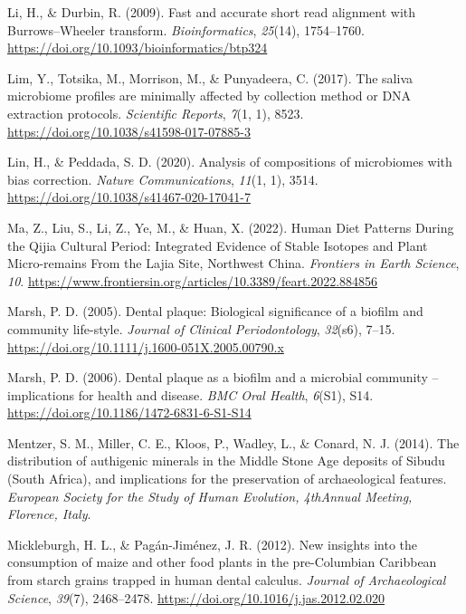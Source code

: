 \documentclass[
]{article}
\newlength{\cslhangindent}
\newlength{\cslentryspacingunit} %
\newenvironment{CSLReferences}[2] %
 {%
  \setlength{\parindent}{0pt}
  \ifodd #1
  \let\oldpar\par
  \def\par{\hangindent=\cslhangindent\oldpar}
  \fi
  \setlength{\parskip}{#2\cslentryspacingunit}
 }%
 {}
\begin{document}
\begin{CSLReferences}{1}{0}
\leavevmode{}%
Li, H., \& Durbin, R. (2009). Fast and accurate short read alignment
with {Burrows}--{Wheeler} transform. \emph{Bioinformatics},
\emph{25}(14), 1754--1760.
\url{https://doi.org/10.1093/bioinformatics/btp324}

\leavevmode{}%
Lim, Y., Totsika, M., Morrison, M., \& Punyadeera, C. (2017). The saliva
microbiome profiles are minimally affected by collection method or {DNA}
extraction protocols. \emph{Scientific Reports}, \emph{7}(1, 1), 8523.
\url{https://doi.org/10.1038/s41598-017-07885-3}

\leavevmode{}%
Lin, H., \& Peddada, S. D. (2020). Analysis of compositions of
microbiomes with bias correction. \emph{Nature Communications},
\emph{11}(1, 1), 3514. \url{https://doi.org/10.1038/s41467-020-17041-7}

\leavevmode{}%
Ma, Z., Liu, S., Li, Z., Ye, M., \& Huan, X. (2022). Human {Diet
Patterns During} the {Qijia Cultural Period}: {Integrated Evidence} of
{Stable Isotopes} and {Plant Micro-remains From} the {Lajia Site},
{Northwest China}. \emph{Frontiers in Earth Science}, \emph{10}.
\url{https://www.frontiersin.org/articles/10.3389/feart.2022.884856}

\leavevmode{}%
Marsh, P. D. (2005). Dental plaque: Biological significance of a biofilm
and community life-style. \emph{Journal of Clinical Periodontology},
\emph{32}(s6), 7--15.
\url{https://doi.org/10.1111/j.1600-051X.2005.00790.x}

\leavevmode{}%
Marsh, P. D. (2006). Dental plaque as a biofilm and a microbial
community -- implications for health and disease. \emph{BMC Oral
Health}, \emph{6}(S1), S14.
\url{https://doi.org/10.1186/1472-6831-6-S1-S14}

\leavevmode{}%
Mentzer, S. M., Miller, C. E., Kloos, P., Wadley, L., \& Conard, N. J.
(2014). The distribution of authigenic minerals in the {Middle Stone
Age} deposits of {Sibudu} ({South Africa}), and implications for the
preservation of archaeological features. \emph{European Society for the
Study of Human Evolution, {4thAnnual} Meeting, Florence, Italy}.

\leavevmode{}%
Mickleburgh, H. L., \& Pagán-Jiménez, J. R. (2012). New insights into
the consumption of maize and other food plants in the pre-{Columbian
Caribbean} from starch grains trapped in human dental calculus.
\emph{Journal of Archaeological Science}, \emph{39}(7), 2468--2478.
\url{https://doi.org/10.1016/j.jas.2012.02.020}


\end{CSLReferences}
\end{document}
